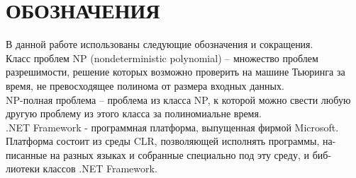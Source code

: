 \chapter*{ОБОЗНАЧЕНИЯ}

В данной работе использованы следующие обозначения и сокращения.\\

Класс проблем NP (nondeterministic polynomial) -- множество проблем разрешимости, решение которых возможно проверить на машине Тьюринга за время, не превосходящее полинома от размера входных данных.\\
NP-полная проблема -- проблема из класса NP, к которой можно свести любую другую проблему из этого класса за полиномиальне время.\\
.NET Framework - программная платформа, выпущенная фирмой Microsoft.
Платформа состоит из среды CLR, позволяющей исполнять программы, на-
писанные на разных языках и собранные специально под эту среду, и биб-
лиотеки классов .NET Framework. \\
